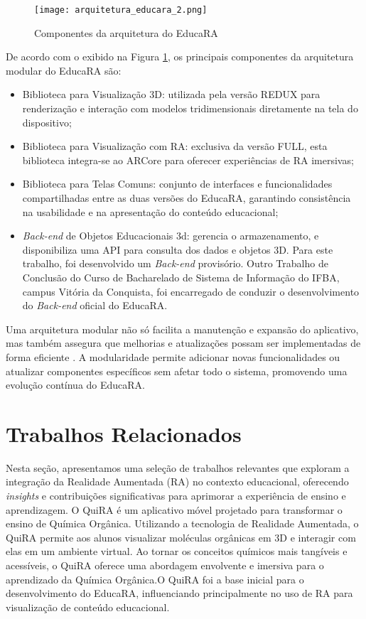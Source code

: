 \documentclass[12pt]{article}
\begin{document}
\begin{figure}[!htb]
  \centering
  \texttt{[image: arquitetura\_educara\_2.png]}
  \caption{Componentes da arquitetura do EducaRA}
  \label{fig:arquitetura_educara}
\end{figure}

De acordo com o exibido na Figura \ref{fig:arquitetura_educara}, os principais componentes da arquitetura modular do EducaRA são:

\begin{itemize}
    \item Biblioteca para Visualização 3D: utilizada pela versão REDUX para renderização e interação com modelos tridimensionais diretamente na tela do dispositivo;
    \item Biblioteca para Visualização com RA: exclusiva da versão FULL, esta biblioteca integra-se ao ARCore para oferecer experiências de RA imersivas;
    \item Biblioteca para Telas Comuns: conjunto de interfaces e funcionalidades compartilhadas entre as duas versões do EducaRA, garantindo consistência na usabilidade e na apresentação do conteúdo educacional;
    \item \textit{Back-end} de Objetos Educacionais 3d: gerencia o armazenamento, e disponibiliza uma API para consulta dos dados e objetos 3D. Para este trabalho, foi desenvolvido um \textit{Back-end} provisório. Outro Trabalho de Conclusão do Curso de Bacharelado de Sistema de Informação do IFBA, campus Vitória da Conquista, foi encarregado de conduzir o desenvolvimento do \textit{Back-end} oficial do EducaRA.
\end{itemize}

Uma arquitetura modular não só facilita a manutenção e expansão do aplicativo, mas também assegura que melhorias e atualizações possam ser implementadas de forma eficiente \cite{gomes2023modularizaccao}. A modularidade permite adicionar novas funcionalidades ou atualizar componentes específicos sem afetar todo o sistema, promovendo uma evolução contínua do EducaRA.

\section{Trabalhos Relacionados}\label{sec:trabalhos-relacionados}

Nesta seção, apresentamos uma seleção de trabalhos relevantes que exploram a integração da Realidade Aumentada (RA) no contexto educacional, oferecendo \textit{insights} e contribuições significativas para aprimorar a experiência de ensino e aprendizagem.
O QuiRA \cite{soares2018quira} é um aplicativo móvel projetado para transformar o ensino de Química Orgânica. Utilizando a tecnologia de Realidade Aumentada, o QuiRA permite aos alunos visualizar moléculas orgânicas em 3D e interagir com elas em um ambiente virtual. Ao tornar os conceitos químicos mais tangíveis e acessíveis, o QuiRA oferece uma abordagem envolvente e imersiva para o aprendizado da Química Orgânica.O QuiRA foi a base inicial para o desenvolvimento do EducaRA, influenciando principalmente no uso de RA para visualização de conteúdo educacional. 
\end{document}
